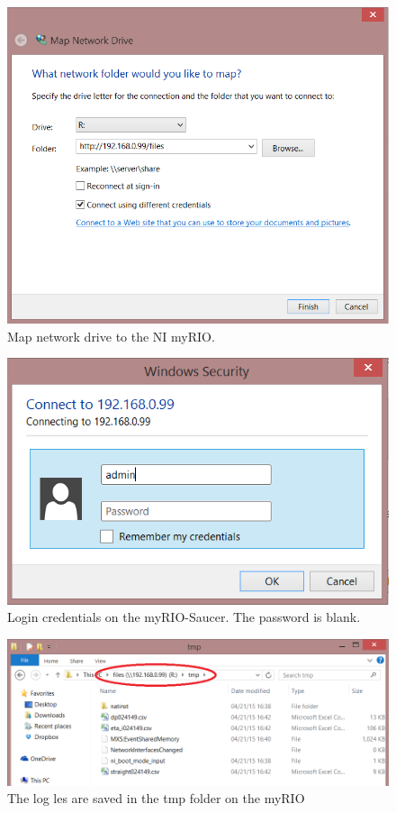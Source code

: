 \documentclass[a4paper,twoside,english]{report}
\begin{document}
\begin{figure}[h]
\centering \includegraphics[scale=0.45]{fig/Saucer_mapnetworkdrive}
\caption{\label{fig: Saucer map network}Map network drive to the NI myRIO.}
\end{figure}
\begin{figure}[h]
\centering \includegraphics[scale=0.45]{fig/Saucer_credentials} \caption{\label{fig: Saucer credentials}Login credentials on the myRIO-Saucer.
The password is blank.}
\end{figure}
\begin{figure}[h]
\centering \includegraphics[scale=0.45]{fig/saucer_logfiles} \caption{\label{fig: Saucer log files}The log les are saved in the tmp folder
on the myRIO}
\end{figure}
\end{document}
